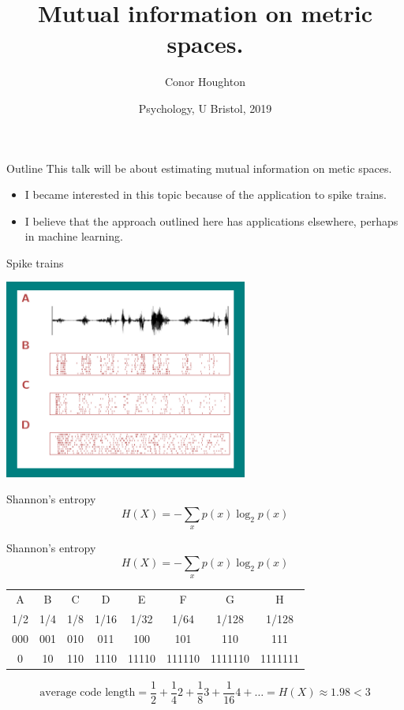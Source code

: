 \documentclass{beamer}
\title[A Kozachenko-Leonenko estimator.]{Mutual information on metric spaces.}
\author{Conor Houghton}
\institute{CS, U Bristol}
\date{Psychology, U Bristol, 2019}
\begin{document}
\maketitle

\begin{frame}{Outline}
This talk will be about estimating mutual information on metic spaces.
\begin{itemize}
\item I became interested in this topic because of the application to spike trains.
\item I believe that the approach outlined here has applications elsewhere, perhaps in machine learning.
\end{itemize}
\color{black}
\end{frame}


\begin{frame}{Spike trains}
\color{reddish}
\begin{center}
\includegraphics[width=8cm]{SpikeTrains.png}
\end{center}
\end{frame}


\begin{frame}{Shannon's entropy}
\color{dark}
$$
H(X)=-\sum_x p(x)\log_2{p(x)}
$$
\color{black}
\end{frame}



\begin{frame}{Shannon's entropy}
\color{dark}
$$
H(X)=-\sum_x p(x)\log_2{p(x)}
$$
\color{black}
\begin{center}
\begin{tabular}{cccccccc}
A& B& C& D& E& F& G& H\\
1/2&1/4&1/8&1/16&1/32&1/64&1/128&1/128\\
000&001&010&011&100&101&110&111\\
0&10&110&1110&11110&111110&1111110&1111111
\end{tabular}
\end{center}
\color{dark}
$$
\mbox{average code length}=\frac{1}{2}+\frac{1}{4}2+\frac{1}{8}3+\frac{1}{16}4+\ldots = H(X)\approx 1.98 < 3
$$
\color{black}
\end{frame}
\end{document}
